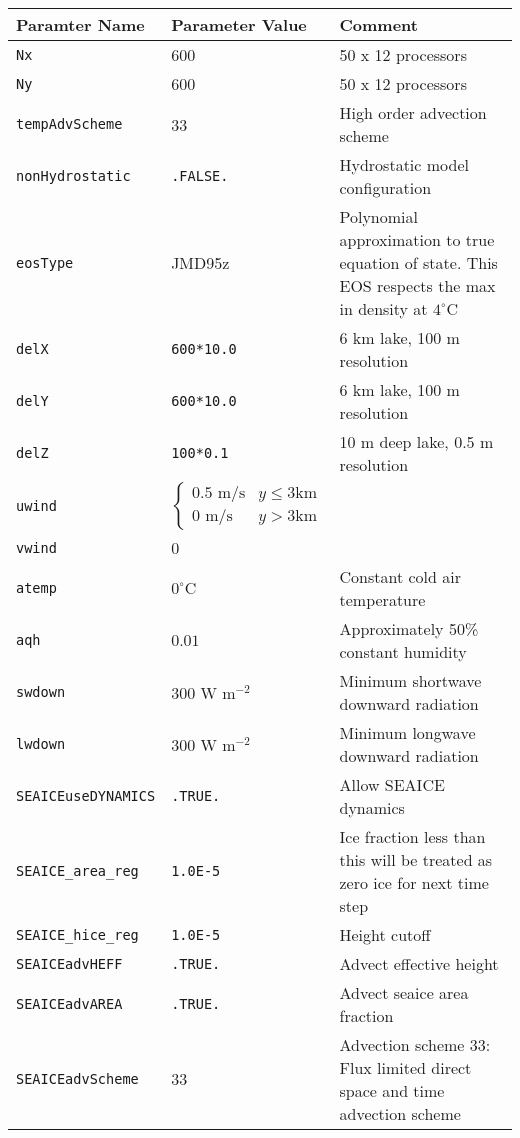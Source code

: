 \documentclass[11pt]{article}
\begin{document}
\begin{longtable}{  p{}  p{}  p{}  }
\hline
\textbf{Paramter Name} & \textbf{Parameter Value} & \textbf{Comment} \\ \hline
\verb|Nx| & 600 & 50 x 12 processors \\ \hline
\verb|Ny| & 600 & 50 x 12 processors \\ \hline
\verb|tempAdvScheme|	&	33	&	High order advection scheme \\ \hline
\verb|nonHydrostatic| & \verb|.FALSE.| & Hydrostatic model configuration \\ \hline
\verb|eosType|		&	JMD95z	&	Polynomial approximation to true equation of state. This EOS respects the max in density at $4^{\circ} \textrm{C}$\\ \hline
\verb|delX|			&	\verb|600*10.0|	&	6 km lake, 100 m resolution \\ \hline
\verb|delY|			&	\verb|600*10.0|	&	6 km lake, 100 m resolution \\ \hline
\verb|delZ|			&	\verb|100*0.1 |	&	10 m deep lake, 0.5 m resolution \\ \hline

\verb|uwind|		&	\begin{equation*} \begin{cases} 0.5 \text{ m/s} & y \leq 3 \text{km} \\ 0 \text{ m/s} & y > 3 \text{km}   \end{cases} \end{equation*} & \\ \hline
\verb|vwind| 	& 0	& \\ \hline
\verb|atemp| 	& $0^{\circ} \text{C}$		& Constant cold air temperature \\ \hline
\verb|aqh| 		& $0.01$		&	Approximately 50\% constant humidity \\ \hline
\verb|swdown| 	& $300 \text{ W} \text{ m}^{-2}$	& Minimum shortwave downward radiation \\ \hline
\verb|lwdown| 	& $300 \text{ W} \text{ m}^{-2}$	& Minimum longwave downward radiation \\ \hline

\verb|SEAICEuseDYNAMICS| & \verb|.TRUE.| & Allow SEAICE dynamics \\ \hline
\verb|SEAICE_area_reg|   & \verb|1.0E-5| & Ice fraction less than this will be treated as zero ice for next time step \\ \hline
\verb|SEAICE_hice_reg|   & \verb|1.0E-5| & Height cutoff \\ \hline
\verb|SEAICEadvHEFF|     & \verb|.TRUE.| & Advect effective height \\ \hline
\verb|SEAICEadvAREA|     & \verb|.TRUE.| & Advect seaice area fraction \\ \hline
\verb|SEAICEadvScheme|   & $33$			& Advection scheme 33: Flux limited direct space and time advection scheme \\ \hline


\end{longtable}
\end{document}
